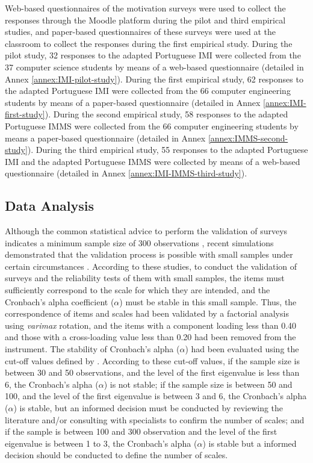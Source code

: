 Web-based questionnaires of the motivation surveys were used to collect the responses through the Moodle platform during the pilot and third empirical studies, and paper-based questionnaires of these surveys were used at the classroom to collect the responses during the first empirical study. During the pilot study, 32 responses to the adapted Portuguese IMI were collected from the 37 computer science students by means of a web-based questionnaire (detailed in Annex \ref{annex:IMI-pilot-study}). During the first empirical study, 62 responses to the adapted Portuguese IMI were collected from the 66 computer engineering students by means of a paper-based questionnaire (detailed in Annex \ref{annex:IMI-first-study}). During the second empirical study, 58 responses to the adapted Portuguese IMMS were collected from the 66 computer engineering students by means a paper-based questionnaire (detailed in Annex \ref{annex:IMMS-second-study}). During the third empirical study, 55 responses to the adapted Portuguese IMI and the adapted Portuguese IMMS were collected by means of a web-based questionnaire (detailed in Annex \ref{annex:IMI-IMMS-third-study}).

\subsection{Data Analysis}

Although the common statistical advice to perform the validation of surveys indicates a minimum sample size of 300 observations \cite{Kline1986}, recent simulations demonstrated that the validation process is possible with small samples under certain circumstances \cite{GuadagnoliVelicer1988, RouquetteFalissard2011, Yurdugul2008}. According to these studies, to conduct the validation of surveys and the reliability tests of them with small samples, the items must sufficiently correspond to the scale for which they are intended, and the Cronbach’s alpha coefficient ($\alpha$) must be stable in this small sample. Thus, the correspondence of items and scales had been validated by a factorial analysis using \emph{varimax} rotation, and the items with a component loading less than 0.40 and those with a cross-loading value less than 0.20 had been removed from the instrument. The stability of Cronbach’s alpha ($\alpha$) had been evaluated using the cut-off values defined by . According to these cut-off values, if the sample size is between 30 and 50 observations, and the level of the first eigenvalue is less than 6, the Cronbach’s alpha ($\alpha$) is not stable; if the sample size is between 50 and 100, and the level of the first eigenvalue is between 3 and 6, the Cronbach’s alpha ($\alpha$) is stable, but an informed decision must be conducted by reviewing the literature and/or consulting with specialists to confirm the number of scales; and if the sample is between 100 and 300 observation and the level of the first eigenvalue is between 1 to 3, the Cronbach’s alpha ($\alpha$) is stable but a informed decision should be conducted to define the number of scales.

